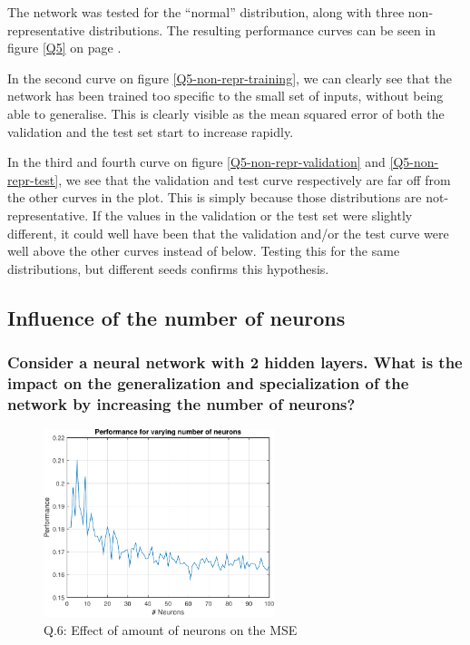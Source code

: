 \documentclass[12pt, a4paper]{article}
\begin{document}
The network was tested for the ``normal'' distribution, along with three non-representative distributions. The resulting performance curves can be seen in figure \ref{Q5} on page \pageref{Q5}.

In the second curve on figure \ref{Q5-non-repr-training}, we can clearly see that the network has been trained too specific to the small set of inputs, without being able to generalise. This is clearly visible as the mean squared error of both the validation and the test set start to increase rapidly.

In the third and fourth curve on figure \ref{Q5-non-repr-validation} and \ref{Q5-non-repr-test}, we see that the validation and test curve respectively are far off from the other curves in the plot. This is simply because those distributions are not-representative. If the values in the validation or the test set were slightly different, it could well have been that the validation and/or the test curve were well above the other curves instead of below. Testing this for the same distributions, but different seeds confirms this hypothesis.

\subsection*{Influence of the number of neurons}
\setcounter{subsubsection}{5}
\subsubsection{Consider a neural network with 2 hidden layers. What is the impact on the generalization and specialization of the network by increasing the number of neurons?}

\begin{figure}[htbp]
	\centering
	\includegraphics[width=0.6\textwidth]{Q6-100}
	\caption{Q.6: Effect of amount of neurons on the MSE}
	\label{Q6}
\end{figure}
\end{document}
